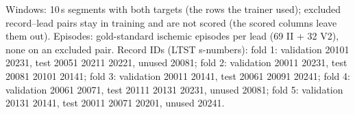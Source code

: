 \begin{table}[htbp]
\par\smallskip\footnotesize Windows: 10\,s segments with both targets (the rows the trainer used); excluded record--lead pairs stay in training and are not scored (the scored columns leave them out). Episodes: gold-standard ischemic episodes per lead (69 II + 32 V2), none on an excluded pair. Record IDs (LTST s-numbers): fold 1: validation 20101 20231, test 20051 20211 20221, unused 20081; fold 2: validation 20011 20231, test 20081 20101 20141; fold 3: validation 20011 20141, test 20061 20091 20241; fold 4: validation 20061 20071, test 20111 20131 20231, unused 20081; fold 5: validation 20131 20141, test 20011 20071 20201, unused 20241.
\end{table}
